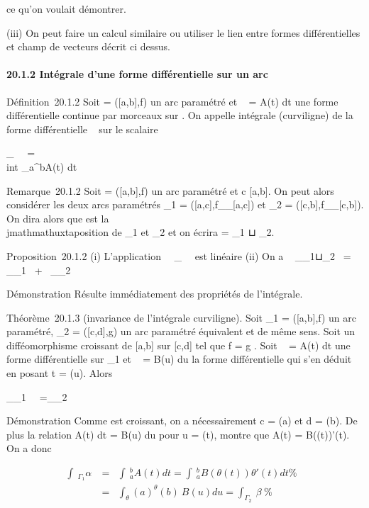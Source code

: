 \documentclass[]{article}
\begin{document}
ce qu'on voulait démontrer.

(iii) On peut faire un calcul similaire ou utiliser le lien entre formes
différentielles et champ de vecteurs décrit ci dessus.

\paragraph{20.1.2 Intégrale d'une forme différentielle sur un arc}

Définition~20.1.2 Soit \Gamma = ({[}a,b{]},f) un arc paramétré et \alpha~ = A(t) dt
une forme différentielle continue par morceaux sur \Gamma. On appelle
intégrale (curviligne) de la forme différentielle \alpha~ sur \Gamma le scalaire

\int  _\Gamma~\alpha~ =\\int
 _a^bA(t) dt

Remarque~20.1.2 Soit \Gamma = ({[}a,b{]},f) un arc paramétré et c \in
{[}a,b{]}. On peut alors considérer les deux arcs paramétrés
\Gamma_1 = ({[}a,c{]},f__{[}a,c{]}) et
\Gamma_2 = ({[}c,b{]},f__{[}c,b{]}). On
dira alors que \Gamma est la \\jmathmathuxtaposition de \Gamma_1 et \Gamma_2 et
on écrira \Gamma = \Gamma_1 ⊔ \Gamma_2.

Proposition~20.1.2 (i) L'application
\alpha~\mapsto~\int  _\Gamma~\alpha~
est linéaire (ii) On a \int ~
_\Gamma_1⊔\Gamma_2\alpha~ =\int ~
_\Gamma_1\alpha~ +\int ~
_\Gamma_2\alpha~

Démonstration Résulte immédiatement des propriétés de l'intégrale.

Théorème~20.1.3 (invariance de l'intégrale curviligne). Soit
\Gamma_1 = ({[}a,b{]},f) un arc paramétré, \Gamma_2 =
({[}c,d{]},g) un arc paramétré équivalent et de même sens. Soit \theta un
difféomorphisme croissant de {[}a,b{]} sur {[}c,d{]} tel que f = g \cdot \theta.
Soit \alpha~ = A(t) dt une forme différentielle sur \Gamma_1 et \beta~ = B(u)
du la forme différentielle qui s'en déduit en posant t = \theta(u). Alors

\int  _\Gamma_1~\alpha~
=\int  _\Gamma_2~\beta~

Démonstration Comme \theta est croissant, on a nécessairement c = \theta(a) et d =
\theta(b). De plus la relation A(t) dt = B(u) du pour u = \theta(t), montre que
A(t) = B(\theta(t))\theta'(t). On a donc

\begin{align*} \int ~
_\Gamma_1\alpha~& =& \int ~
_a^bA(t) dt =\int ~
_a^bB(\theta(t))\theta'(t) dt\%& \\
& =& \int  _\theta(a)^\theta(b)~B(u) du
=\int  _\Gamma_2~\beta~ \%&
\\ \end{align*}
\end{document}
